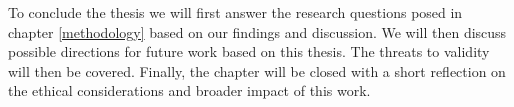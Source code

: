     
To conclude the thesis we will first answer the research questions posed in chapter \ref{methodology} based on our findings and discussion. We will then discuss possible directions for future work based on this thesis. The threats to validity will then be covered. Finally, the chapter will be closed with a short reflection on the ethical considerations and broader impact of this work.

